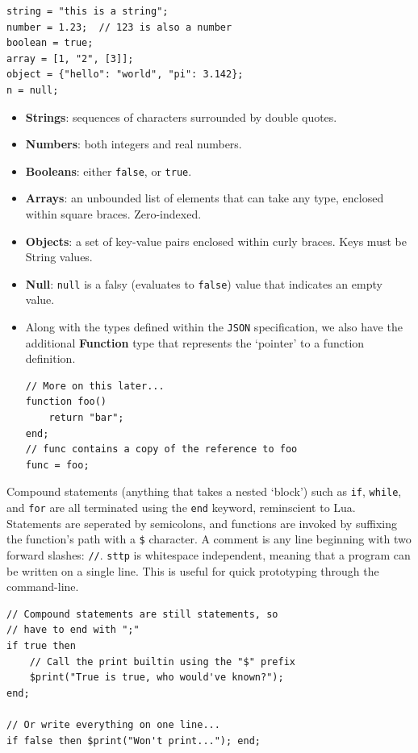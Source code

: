 \documentclass[]{full}
\theoremstyle{definition}
\begin{document}
\begin{verbatim}
string = "this is a string";
number = 1.23;  // 123 is also a number
boolean = true;
array = [1, "2", [3]];
object = {"hello": "world", "pi": 3.142};
n = null;
\end{verbatim}

\begin{itemize}
    \item \textbf{Strings}: sequences of characters surrounded by double quotes.
    \item \textbf{Numbers}: both integers and real numbers.
    \item \textbf{Booleans}: either \verb|false|, or \verb|true|.
    \item \textbf{Arrays}: an unbounded list of elements that can take any type, enclosed within square braces. Zero-indexed.
    \item \textbf{Objects}: a set of key-value pairs enclosed within curly braces. Keys must be String values.
    \item \textbf{Null}: \verb|null| is a falsy (evaluates to \verb|false|) value that indicates an empty value.
    \item Along with the types defined within the \verb|JSON| specification, we also have the additional \textbf{Function} type that represents the `pointer' to a function definition.
    \begin{verbatim}
// More on this later...
function foo()
    return "bar";
end;
// func contains a copy of the reference to foo
func = foo;    
    \end{verbatim}
\end{itemize}

Compound statements (anything that takes a nested `block') such as \verb|if|, \verb|while|, and \verb|for| are all terminated using the \verb|end| keyword, reminscient to Lua. Statements are seperated by semicolons, and functions are invoked by suffixing the function's path with a \verb|$| character. A comment is any line beginning with two forward slashes: \verb|//|. \verb|sttp| is whitespace independent, meaning that a program can be written on a single line. This is useful for quick prototyping through the command-line.

\begin{verbatim}
// Compound statements are still statements, so
// have to end with ";"
if true then
    // Call the print builtin using the "$" prefix
    $print("True is true, who would've known?");
end;

// Or write everything on one line...
if false then $print("Won't print..."); end;
\end{verbatim}
\end{document}
